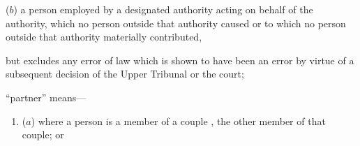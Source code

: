 \documentclass[12pt,a4paper]{article}
\begin{document}
\begin{enumerate}
\begin{enumerate}
   ($b$) 
    a person employed by a designated authority acting on behalf of the authority, which no person outside that authority caused or to which no person outside that authority materially contributed,
\end{enumerate}
    but excludes any error of law which is shown to have been an error by virtue of a subsequent decision of 
the Upper Tribunal  %
or the court;


%




“partner” means—
\begin{enumerate}\item[]
    ($a$) 
    where a person is a member of 
a couple%
, the other member of that couple; or


\end{enumerate}
\end{enumerate}
\end{document}
